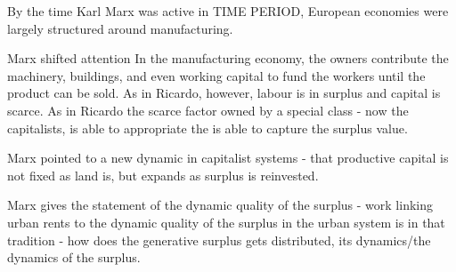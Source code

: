By the time Karl Marx was active in TIME PERIOD, European economies were largely structured around manufacturing. 

 Marx shifted attention %
 In the manufacturing economy, the owners contribute the machinery, buildings, and even working capital to fund the workers until the product can be sold. %
As in Ricardo, however, labour is in surplus and capital is scarce. As in Ricardo the scarce factor owned by a special class - now the capitalists, is able to appropriate the is able to capture the surplus value. %

Marx pointed to a new dynamic in capitalist systems - that productive capital is not fixed as land is, but  expands as surplus is reinvested. %

Marx gives the statement of the dynamic quality of the surplus
- work linking urban rents to the dynamic quality of the surplus in the urban system is in that tradition 
- how does the generative surplus gets distributed, its dynamics/the dynamics of the surplus. %

 
